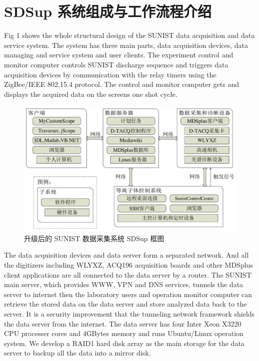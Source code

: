 \section{SDSup 系统组成与工作流程介绍}

Fig 1 shows the whole structural design of the SUNIST data acquisition and data service system. The system has three main parts, data acquisition devices, data managing and service system and user clients. The experiment control and monitor computer controls SUNIST discharge sequence and triggers data acquisition devices by communication with the relay timers using the ZigBee/IEEE 802.15.4 protocol. The control and monitor computer gets and displays the acquired data on the screens one shot cycle.

\begin{figure}%
  \centering
  \includegraphics[width=\textwidth]{data-system-chs_cropped.pdf}
  \caption{升级后的 SUNIST 数据采集系统 SDSup 框图}
  \label{fig:chap04:SDSup-system}
\end{figure}

The data acquisition devices and data server form a separated network. And all the digitizers including WLYXZ, ACQ196 acquisition boards and other MDSplus client applications are all connected to the data server by a router. The SUNIST main server, which provides WWW, VPN and DNS services, tunnels the data server to internet then the laboratory users and operation monitor computer can retrieve the stored data on the data server and store analyzed data back to the server. It is a security improvement that the tunneling network framework shields the data server from the internet. The data server has four Inter Xeon X3220 CPU processer cores and 4GBytes memory and runs Ubuntu/Linux operation system. We develop a RAID1 hard disk array as the main storage for the data server to backup all the data into a mirror disk.

